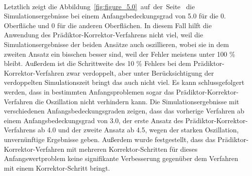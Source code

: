 \documentclass{listhesis}
\begin{document}
\paragraph{}
Letztlich zeigt die Abbildung~\ref{fig:figure_5.0}~auf~der~Seite~\pageref{fig:figure_5.0} die Simulationsergebnisse bei einem Anfangsbedeckungsgrad von 5.0 für die 0. Oberfläche und 0 für die anderen Oberflächen. In diesem Fall hilft die Anwendung des Prädiktor-Korrektor-Verfahrens nicht viel, weil die Simulationsergebnisse der beiden Ansätze auch oszillieren, wobei sie in dem zweiten Ansatz ein bisschen besser sind, weil der Fehler meistens unter 100 \% bleibt. Außerdem ist die Schrittweite des 10 \% Fehlers bei dem Prädiktor-Korrektor-Verfahren zwar verdoppelt, aber unter Berücksichtigung der verdoppelten Simulationszeit bringt das auch nicht viel. Es kann schlussgefolgert werden, dass in bestimmten Anfangsproblemen sogar das Prädiktor-Korrektor-Verfahren die Oszillation nicht verhindern kann. Die Simulationsergebnisse mit verschiedenen Anfangsbedeckungsgraden zeigen, dass das vorherige Verfahren ab einem Anfangsbedeckungsgrad von 3.0, der erste Ansatz des Prädiktor-Korrektor-Verfahrens ab 4.0 und der zweite Ansatz ab 4.5, wegen der starken Oszillation, unvernünftige Ergebnisse geben. Außerdem wurde festgestellt, dass das Prädiktor-Korrektor-Verfahren mit mehreren Korrektor-Schritten für dieses Anfangswertproblem keine signifikante Verbesserung gegenüber dem Verfahren mit einem Korrektor-Schritt bringt.


\clearpage
\end{document}
